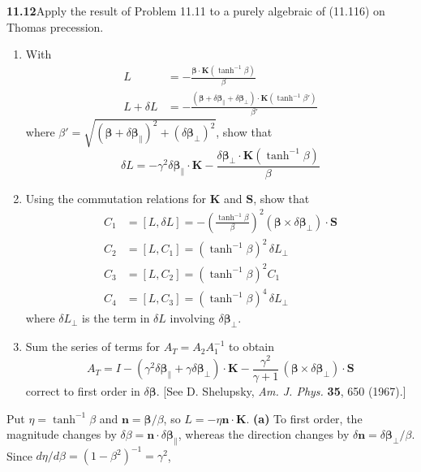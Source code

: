 \par\bigskip
\noindent\textbf{11.12}\quad Apply the result of Problem 11.11 to a purely algebraic  of (11.116) on Thomas precession.
\begin{enumerate}
\item[(a)] With
\begin{align*}
L&=-\frac{\boldsymbol{\beta}\cdot\mathbf{K}(\tanh^{-1}\beta)}{\beta}\\[6pt]
L+\delta L&=-\frac{(\boldsymbol{\beta}+\delta\boldsymbol{\beta}_{\parallel}+\delta\boldsymbol{\beta}_{\perp})\cdot\mathbf{K}(\tanh^{-1}\beta')}{\beta'}
\end{align*}
where $\beta'=\sqrt{(\boldsymbol{\beta}+\delta\boldsymbol{\beta}_{\parallel})^{2}+(\delta\boldsymbol{\beta}_{\perp})^{2}}$, show that
\[
\delta L=-\gamma^{2}\delta\boldsymbol{\beta}_{\parallel}\cdot\mathbf{K}-\frac{\delta\boldsymbol{\beta}_{\perp}\cdot\mathbf{K}(\tanh^{-1}\beta)}{\beta}
\]
\item[(b)] Using the commutation relations for $\mathbf{K}$ and $\mathbf{S}$, show that
\begin{align*}
C_{1}&=[L,\delta L]=-\left(\frac{\tanh^{-1}\beta}{\beta}\right)^{2}\!(\boldsymbol{\beta}\times\delta\boldsymbol{\beta}_{\perp})\cdot\mathbf{S}\\
C_{2}&=[L,C_{1}]=(\tanh^{-1}\beta)^{2}\,\delta L_{\perp}\\
C_{3}&=[L,C_{2}]=(\tanh^{-1}\beta)^{2}C_{1}\\
C_{4}&=[L,C_{3}]=(\tanh^{-1}\beta)^{4}\,\delta L_{\perp}
\end{align*}
where $\delta L_{\perp}$ is the term in $\delta L$ involving $\delta\boldsymbol{\beta}_{\perp}$.
\item[(c)] Sum the series of terms for $A_{T}=A_{2}A_{1}^{-1}$ to obtain
\[
A_{T}=I-(\gamma^{2}\delta\boldsymbol{\beta}_{\parallel}+\gamma\delta\boldsymbol{\beta}_{\perp})\cdot\mathbf{K}-\frac{\gamma^{2}}{\gamma+1}\,(\boldsymbol{\beta}\times\delta\boldsymbol{\beta}_{\perp})\cdot\mathbf{S}
\]
correct to first order in $\delta\boldsymbol{\beta}$. [See D. Shelupsky, \emph{Am. J. Phys.} \textbf{35}, 650 (1967).]
\end{enumerate}
\solution
Put $\eta=\tanh^{-1}\beta$ and
$\mathbf n=\boldsymbol\beta/\beta$, so $L=-\eta\mathbf n\cdot\mathbf K$.
\textbf{(a)} To first order, the magnitude changes by
$\delta\beta=\mathbf n\cdot\delta\boldsymbol\beta_\parallel$,
whereas the direction changes by
$\delta\mathbf n=\delta\boldsymbol\beta_\perp/\beta$.
Since $d\eta/d\beta=(1-\beta^2)^{-1}=\gamma^2$,
